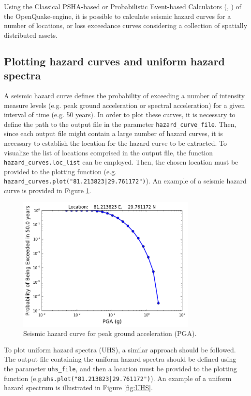Using the Classical PSHA-based or Probabilistic Event-based Calculators (\cite{SilvaEtAl2014a}, \cite{PaganiEtAl2014a}) of the OpenQuake-engine, it is possible to calculate seismic hazard curves for a number of locations, or loss exceedance curves considering a collection of spatially distributed assets.

\subsection{Plotting hazard curves and uniform hazard spectra}
\label{subsec:plot-hazard_curves}
A seismic hazard curve defines the probability of exceeding a number of intensity measure levels (e.g. peak ground acceleration or spectral acceleration) for a given interval of time (e.g. 50 years). In order to plot these curves, it is necessary to define the path to the output file in the parameter \verb=hazard_curve_file=. Then, since each output file might contain a large number of hazard curves, it is necessary to establish the location for the hazard curve to be extracted. To visualize the list of locations comprised in the output file, the function \verb=hazard_curves.loc_list= can be employed. Then, the chosen location must be provided to the plotting function (e.g. \verb=hazard_curves.plot("81.213823|29.761172")=). An example of a seismic hazard curve is provided in Figure \ref{fig:hazard_curve}.\\

\begin{figure}[htb]
  \centering
      \includegraphics[width=9cm]{figures/hazard_curve.png}
  \caption{Seismic hazard curve for peak ground acceleration (PGA).}
  \label{fig:hazard_curve}
\end{figure}

To plot uniform hazard spectra (UHS), a similar approach should be followed. The output file containing the uniform hazard spectra should be defined using the parameter \verb=uhs_file=, and then a location must be provided to the plotting function (e.g.\verb=uhs.plot("81.213823|29.761172")=). An example of a uniform hazard spectrum is illustrated in Figure \ref{fig:UHS}.

